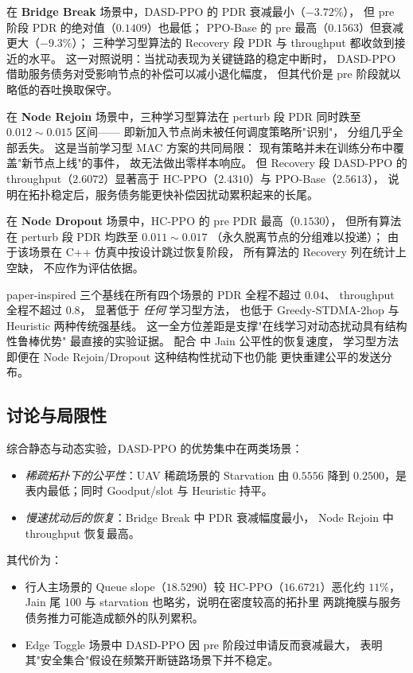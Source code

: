 在 \textbf{Bridge Break} 场景中，DASD-PPO 的 PDR 衰减最小（$-3.72\%$），
但 pre 阶段 PDR 的绝对值（$0.1409$）也最低；
PPO-Base 的 pre 最高（$0.1563$）但衰减更大（$-9.3\%$）；
三种学习型算法的 Recovery 段 PDR 与 throughput 都收敛到接近的水平。
这一对照说明：当扰动表现为关键链路的稳定中断时，
DASD-PPO 借助服务债务对受影响节点的补偿可以减小退化幅度，
但其代价是 pre 阶段就以略低的吞吐换取保守。

在 \textbf{Node Rejoin} 场景中，三种学习型算法在 perturb 段
PDR 同时跌至 $0.012\sim0.015$ 区间——
即新加入节点尚未被任何调度策略所"识别"，
分组几乎全部丢失。
这是当前学习型 MAC 方案的共同局限：
现有策略并未在训练分布中覆盖"新节点上线"的事件，
故无法做出零样本响应。
但 Recovery 段 DASD-PPO 的 throughput（$2.6072$）显著高于
HC-PPO（$2.4310$）与 PPO-Base（$2.5613$），
说明在拓扑稳定后，服务债务能更快补偿因扰动累积起来的长尾。

在 \textbf{Node Dropout} 场景中，HC-PPO 的 pre PDR 最高（$0.1530$），
但所有算法在 perturb 段 PDR 均跌至 $0.011\sim0.017$
（永久脱离节点的分组难以投递）；
由于该场景在 C++ 仿真中按设计跳过恢复阶段，
所有算法的 Recovery 列在统计上空缺，
不应作为评估依据。

paper-inspired 三个基线在所有四个场景的 PDR 全程不超过 $0.04$、
throughput 全程不超过 $0.8$，
显著低于 \emph{任何} 学习型方法，
也低于 Greedy-STDMA-2hop 与 Heuristic 两种传统强基线。
这一全方位差距是支撑"在线学习对动态扰动具有结构性鲁棒优势"
最直接的实验证据。
配合  中 Jain 公平性的恢复速度，
学习型方法即便在 Node Rejoin/Dropout 这种结构性扰动下也仍能
更快重建公平的发送分布。

\subsection{讨论与局限性}
\label{subsec:limitations}

综合静态与动态实验，DASD-PPO 的优势集中在两类场景：
\begin{itemize}
  \item \emph{稀疏拓扑下的公平性}：UAV 稀疏场景的 Starvation 由 $0.5556$ 降到
    $0.2500$，是表内最低；同时 Goodput/slot 与 Heuristic 持平。
  \item \emph{慢速扰动后的恢复}：Bridge Break 中 PDR 衰减幅度最小，
    Node Rejoin 中 throughput 恢复最高。
\end{itemize}
其代价为：
\begin{itemize}
  \item 行人主场景的 Queue slope（$18.5290$）较 HC-PPO（$16.6721$）恶化约 $11\%$，
    Jain 尾 100 与 starvation 也略劣，说明在密度较高的拓扑里
    两跳掩膜与服务债务推力可能造成额外的队列累积。
  \item Edge Toggle 场景中 DASD-PPO 因 pre 阶段过申请反而衰减最大，
    表明其"安全集合"假设在频繁开断链路场景下并不稳定。
\end{itemize}

